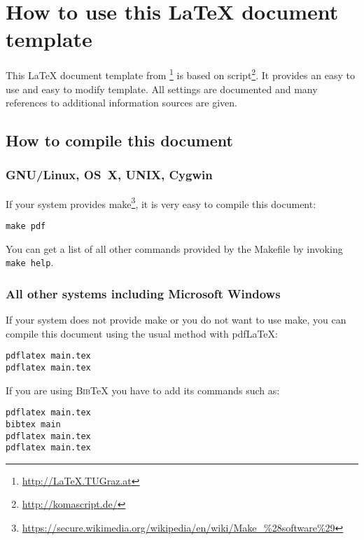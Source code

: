 
\section{How to use this \LaTeX{} document template}

This \LaTeX{} document template from
\myLaT\footnote{\url{http://LaTeX.TUGraz.at}} is based on 
script\footnote{\url{http://komascript.de/}}. It provides an easy to use and
easy to modify template. All settings are documented and many references to
additional information sources are given.

\subsection{How to compile this document}

\subsubsection{\textsc{GNU}/Linux, \textsc{OS~X}, \textsc{UNIX}, Cygwin}

If your system provides 
make\footnote{\url{https://secure.wikimedia.org/wikipedia/en/wiki/Make\_\%28software\%29}},
it is very easy to compile this document:

\begin{verbatim}
make pdf
\end{verbatim}

You can get a list of all other commands provided by the Makefile by invoking
\texttt{make help}.

\subsubsection{All other systems including Microsoft Windows}

If your system does not provide  make or you do not want to use  make,
you can compile this document using the usual method with pdf\LaTeX{}:

\begin{verbatim}
pdflatex main.tex
pdflatex main.tex
\end{verbatim}

If you are using \textsc{Bib}\TeX{} you have to add its commands such as:

\begin{verbatim}
pdflatex main.tex
bibtex main
pdflatex main.tex
pdflatex main.tex
\end{verbatim}

